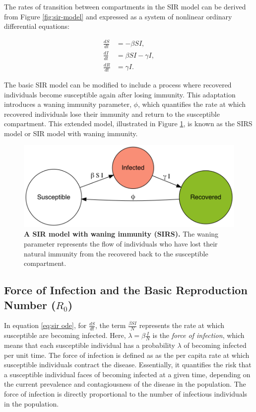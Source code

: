 \documentclass[
11pt, %
oneside, %
english, %
singlespacing, %
]{macthesis} %
\begin{document}
The rates of transition between compartments in the SIR model can be derived from Figure \ref{fig:sir-model} and expressed as a system of nonlinear ordinary differential equations:

\begin{equation}
\begin{aligned}
\frac{dS}{dt} &= -\beta SI, \\
\frac{dI}{dt} &= \beta SI - \gamma I, \\
\frac{dR}{dt} &= \gamma I.
\end{aligned}
\label{eq:sir ode}
\end{equation}

The basic SIR model can be modified to include a process where recovered individuals become susceptible again after losing immunity. This adaptation introduces a waning immunity parameter, \(\phi\), which quantifies the rate at which recovered individuals lose their immunity and return to the susceptible compartment. This extended model, illustrated in Figure \ref{fig:sirs}, is known as the SIRS model or SIR model with waning immunity.

\begin{figure}[H]
\centering
\includegraphics[width=\textwidth]{figure/sirs_model.png}
\caption[Susceptible-Infected-Recovered-Susceptible (SIRS) model]{\textbf{A SIR model with waning immunity (SIRS).} The waning parameter represents the flow of individuals who have lost their natural immunity from the recovered back to the susceptible compartment.}
\label{fig:sirs}
\end{figure}

\subsection{\texorpdfstring{Force of Infection and the Basic Reproduction Number (\(R_0\))}{Force of Infection and the Basic Reproduction Number (R\_0)}}\label{FOI-and-R0}

In equation \ref{eq:sir ode}, for \(\frac{dS}{dt}\), the term \(\frac{\beta SI}{N}\) represents the rate at which susceptible are becoming infected. Here, \(\lambda = \beta \frac{I}{N}\) is the \emph{force of infection}, which means that each susceptible individual has a probability \(\lambda\) of becoming infected per unit time. The force of infection is defined as as the per capita rate at which susceptible individuals contract the disease. Essentially, it quantifies the risk that a susceptible individual faces of becoming infected at a given time, depending on the current prevalence and contagiousness of the disease in the population. The force of infection is directly proportional to the number of infectious individuals in the population.
\end{document}
